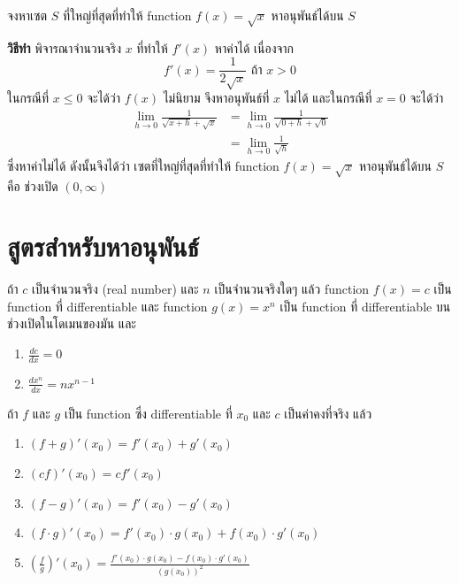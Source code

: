 \documentclass[
]{book}
\begin{document}
จงหาเซต \(S\) ที่ใหญ่ที่สุดที่ทำให้ function \(f(x) = \sqrt{x}\) หาอนุพันธ์ได้บน
\(S\)

\textbf{วิธีทำ} พิจารณาจำนวนจริง \(x\) ที่ทำให้ \(f'(x)\) หาค่าได้ เนื่องจาก
\[f'(x) = \frac{1}{2\sqrt{x}}  \text{ ถ้า } x>0\] ในกรณีที่ \(x \le 0\)
จะได้ว่า \(f(x)\) ไม่นิยาม จึงหาอนุพันธ์ที่ \(x\) ไม่ได้ และในกรณีที่ \(x=0\) จะได้ว่า
\begin{equation}   \begin{aligned}
    \underset{h \rightarrow 0}{\lim}\frac{1}{\sqrt{x+h}+\sqrt{x}}
    &=\underset{h \rightarrow 0}{\lim}\frac{1}{\sqrt{0+h}+\sqrt{0}} \\
    &=\underset{h \rightarrow 0}{\lim}\frac{1}{\sqrt{h}}
  \end{aligned} \end{equation} ซึ่งหาค่าไม่ได้ ดังนั้นจึงได้ว่า เซตที่ใหญ่ที่สุดที่ทำให้
function \(f(x) = \sqrt{x}\) หาอนุพันธ์ได้บน \(S\) คือ ช่วงเปิด \((0,\infty)\)

\section{สูตรสำหรับหาอนุพันธ์}\label{uxe2auxe15uxe23uxe2auxe33uxe2buxe23uxe1auxe2buxe32uxe2duxe19uxe1euxe19uxe18}

ถ้า \(c\) เป็นจำนวนจริง (real number) และ \(n\) เป็นจำนวนจริงใดๆ แล้ว function
\(f(x) = c\) เป็น function ที่ differentiable และ function \(g(x) = x^n\)
เป็น function ที่ differentiable บนช่วงเปิดในโดเมนของมัน และ

\begin{enumerate}
\def\labelenumi{\arabic{enumi}.}
\item
  \(\frac{dc}{dx} = 0\)
\item
  \(\frac{dx^n}{dx} = n x^{n-1}\)
\end{enumerate}

ถ้า \(f\) และ \(g\) เป็น function ซึ่ง differentiable ที่ \(x_0\) และ \(c\)
เป็นค่าคงที่จริง แล้ว

\begin{enumerate}
\def\labelenumi{\arabic{enumi}.}
\item
  \((f+g)'(x_0) = f'(x_0) + g'(x_0)\)
\item
  \((cf)'(x_0) = cf'(x_0)\)
\item
  \((f-g)'(x_0) = f'(x_0) - g'(x_0)\)
\item
  \((f \cdot g)'(x_0) = f'(x_0) \cdot g(x_0) + f(x_0)\cdot g'(x_0)\)
\item
  \((\frac{f}{g})'(x_0) = \frac{f'(x_0) \cdot g(x_0) - f(x_0)\cdot g'(x_0)}{(g(x_0))^2}\)
\end{enumerate}
\end{document}
